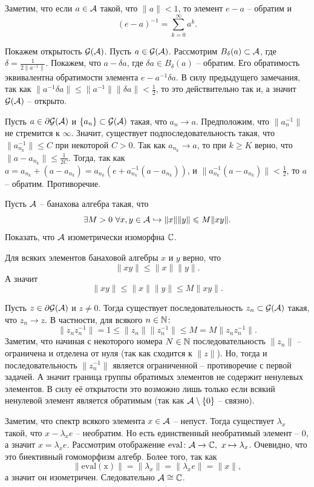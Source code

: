 \begin{solution}
    Заметим, что если $a \in \mathcal{A}$ такой, что $\|a\| < 1$, то элемент $e - a$ -- обратим и 
    \[
        (e - a)^{-1} = \sum_{k = 0}^{\infty} a^k.
    \]

    Покажем открытость $\mathcal{G}(\mathcal{A})$.
    Пусть $a \in \mathcal{G}(\mathcal{A})$.
    Рассмотрим $B_{\delta}(a) \subset \mathcal{A}$, где $\delta = \frac{1}{2\|a^{-1}\|}$.
    Покажем, что $a - \delta a$, где $\delta a \in B_{\delta}(a)$ -- обратим.
    Его обратимость эквивалентна обратимости элемента $e - a^{-1}\delta a$.
    В силу предыдущего замечания, так как $\|a^{-1}\delta a\| \leq \|a^{-1}\|\|\delta a\| < \frac{1}{2}$, то это действительно так и, а значит $\mathcal{G}(\mathcal{A})$ -- открыто.

    Пусть $a \in \partial \mathcal{G}(\mathcal{A})$ и $\{a_n\} \subset \mathcal{G}(\mathcal{A})$ такая, что $a_n \rightarrow a$.
    Предположим, что $\|a_n^{-1}\|$ не стремится к $\infty$.
    Значит, существует подпоследовательность такая, что $\|a_{n_k}^{-1}\| \leq C$ при некоторой $C > 0$. Так как $a_{n_k} \rightarrow a$, то при $k \geq K$ верно, что $\|a - a_{n_k}\| \leq \frac{1}{2C}$. Тогда, так как $a = a_{n_k} + (a - a_{n_k}) = a_{n_k}(e + a_{n_k}^{-1}(a - a_{n_k}))$, и $\|a_{n_k}^{-1}(a - a_{n_k})\| < \frac{1}{2}$, то $a$ -- обратим. 
    Противоречие.
\end{solution}
\begin{task}[T3]
    Пусть $\mathcal{A}$ -- банахова алгебра такая, что
    \[
        \exists M > 0 \ \forall x, y \in \mathcal{A} \hookrightarrow \|x\|\|y\| \leqslant M\|xy\|.
    \]
    Показать, что $\mathcal{A}$ изометрически изоморфна $\mathbb{C}$.
\end{task}
\begin{solution}
    Для всяких элементов банаховой алгебры $x$ и $y$ верно, что
    \[
        \|xy\| \leq \|x\|\|y\|.
    \]
    А значит 
    \[
        \|xy\| \leq \|x\|\|y\| \leq M\|xy\|.
    \]

    Пусть $z \in \partial \mathcal{G}(\mathcal{A})$ и $z \neq 0$.
    Тогда существует последовательность $z_n \subset \mathcal{G}(\mathcal{A})$ такая, что $z_n \rightarrow z$.
    В частности, для всякого $n \in \mathbb{N}\colon$
    \[
        \|z_n z_n^{-1}\| = 1 \leq \|z_n\|\|z_n^{-1}\| \leq M = M\|z_nz_n^{-1}\|.
    \]
    Заметим, что начиная с некоторого номера $N \in \mathbb{N}$ последовательность $\|z_n\|$ -- ограничена и отделена от нуля (так как сходится к $\|z\|$).
    Но, тогда и последовательность $\|z_n^{-1}\|$ является ограниченной -- противоречие с первой задачей. А значит граница группы обратимых элементов не содержит ненулевых элементов.
    В силу её открытости это возможно лишь только если всякий ненулевой элемент является обратимым (так как $\mathcal{A} \setminus \{0\}$ -- связно).

    Заметим, что спектр всякого элемента $x \in \mathcal{A}$ -- непуст.
    Тогда существует $\lambda_x$ такой, что $x - \lambda_x e$ -- необратим.
    Но есть единственный необратимый элемент -- $0$, а значит $x = \lambda_x e$.
    Рассмотрим отображение $\mathrm{eval}\colon \mathcal{A} \to \mathbb{C}, \ x \mapsto \lambda_x$.
    Очевидно, что это биективный гомоморфизм алгебр.
    Более того, так как
    \[
        \|\mathrm{eval(x)}\| = \|\lambda_x\| = \|\lambda_x e\| = \|x\|,
    \]
    а значит он изометричен.
    Следовательно $\mathcal{A} \cong \mathbb{C}$.
\end{solution}
